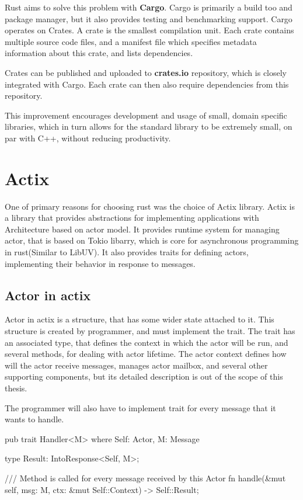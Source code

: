 Rust aims to solve this problem with \textbf{Cargo}. Cargo is primarily a build too and package manager, but it also
provides testing and benchmarking support. Cargo operates on Crates. A crate is the smallest compilation unit.
Each crate contains multiple source code files, and a manifest file which specifies metadata information about this crate, and lists dependencies.

Crates can be published and uploaded to \textbf{crates.io} repository, which is closely integrated with Cargo. Each crate can then
also require dependencies from this repository.

This improvement encourages development and usage of small, domain specific libraries, which in
turn allows for the standard library to be extremely small, on par with C++, without reducing productivity.

\section{Actix}
One of primary reasons for choosing rust was the choice of Actix\cite{web:actix} library. Actix is a library that provides abstractions
for implementing applications with Architecture based on actor model. It provides runtime system for managing actor, that is
based on Tokio libarry, which is core for asynchronous programming in rust(Similar to LibUV). It also provides
traits for defining actors, implementing their behavior in response to messages.

\subsection{Actor in actix}
Actor in actix is a structure, that has some wider state attached to it. This structure is created by programmer, and must
implement the  trait. The  trait has an associated type, that defines the context in which the actor will be run,
and several methods, for dealing with actor lifetime.
The actor context defines how will the actor receive messages, manages actor mailbox, and several other
supporting components, but its detailed description is out of the scope of this thesis.

The programmer will also have to implement  trait for every message that it wants to handle.

\begin{code}[language=rust,label={handler_trait},caption={Handler trait}]
    pub trait Handler<M> where Self: Actor, M: Message
    {
        type Result: IntoResponse<Self, M>;

        /// Method is called for every message received by this Actor
        fn handle(&mut self, msg: M, ctx: &mut Self::Context) -> Self::Result;

    }
\end{code}

